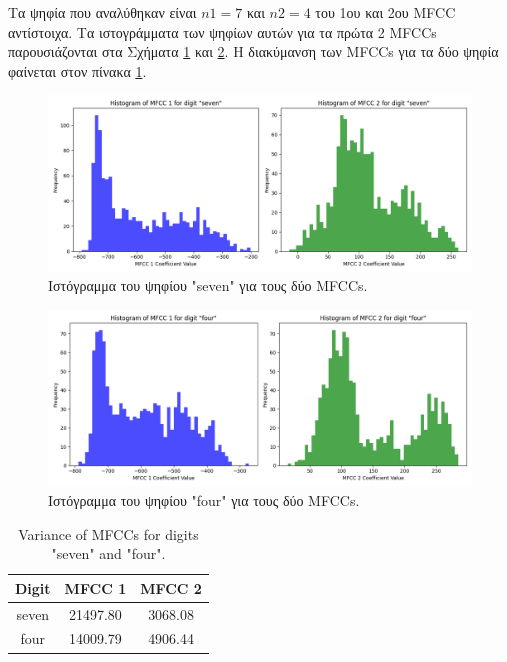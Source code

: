 \documentclass[a4paper,12pt]{article}
\begin{document}
Τα ψηφία που αναλύθηκαν είναι $n1=7$ και $n2=4$ του 1ου και 2ου MFCC αντίστοιχα. Τα ιστογράμματα των ψηφίων αυτών για τα πρώτα 2 MFCCs παρουσιάζονται στα
Σχήματα \ref{fig:hist1} και \ref{fig:hist2}. Η διακύμανση των MFCCs για τα δύο ψηφία φαίνεται στον πίνακα \ref{tab:variance}.

\begin{figure}[H]
    \centering
    \includegraphics[width=\textwidth]{images/histograms_seven.png}
    \caption{Ιστόγραμμα του ψηφίου "seven" για τους δύο MFCCs.}
    \label{fig:hist1}
\end{figure}

\begin{figure}[H]
    \centering
    \includegraphics[width=\textwidth]{images/histograms_four.png}
    \caption{Ιστόγραμμα του ψηφίου "four" για τους δύο MFCCs.}
    \label{fig:hist2}
\end{figure}

\begin{table}
    \centering
    \begin{tabular}{|c|c|c|}
        \hline
        \textbf{Digit} & \textbf{MFCC 1} & \textbf{MFCC 2} \\ \hline
        seven          & 21497.80        & 3068.08         \\ \hline
        four           & 14009.79        & 4906.44         \\ \hline
    \end{tabular}
    \caption{Variance of MFCCs for digits "seven" and "four".}
    \label{tab:variance}
\end{table}
\end{document}
